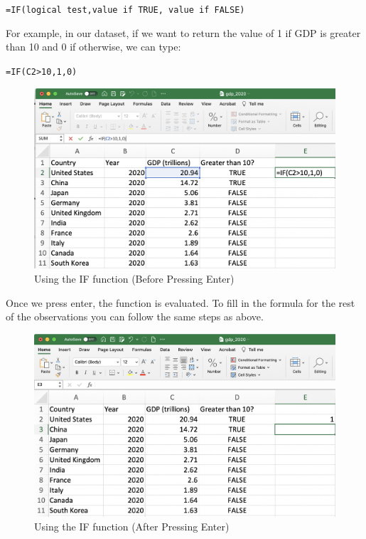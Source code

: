 \documentclass[
]{book}
\begin{document}
\begin{center}
\colorbox{gray!20}{\texttt{=IF(logical test,value if TRUE, value if FALSE)}}
\end{center}

For example, in our dataset, if we want to return the value of 1 if GDP is greater than 10 and 0 if otherwise, we can type:

\begin{center}
\colorbox{gray!20}{\texttt{=IF(C2>10,1,0)}}
\end{center}

\begin{figure}

{\centering \includegraphics[width=1\linewidth]{images/01_if1} 

}

\caption{Using the IF function (Before Pressing Enter)}\label{fig:ifex1}
\end{figure}

Once we press enter, the function is evaluated. To fill in the formula for the rest of the observations you can follow the same steps as above.

\begin{figure}

{\centering \includegraphics[width=1\linewidth]{images/01_if2} 

}

\caption{Using the IF function (After Pressing Enter)}\label{fig:ifex2}
\end{figure}
\end{document}
